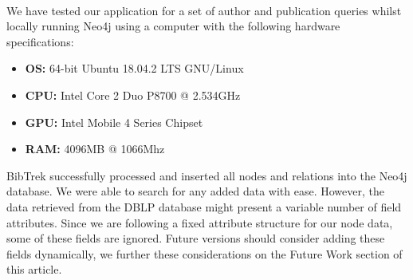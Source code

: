 \documentclass[twocolumn]{article}
\begin{document}
\\[1\baselineskip]
We have tested our application for a set of author and publication queries whilst locally running Neo4j using a computer with the following hardware specifications:
\begin{itemize}
\item \textbf{OS:} 64-bit Ubuntu 18.04.2 LTS GNU/Linux 
\item \textbf{CPU:} Intel Core 2 Duo P8700 @ 2.534GHz 
\item \textbf{GPU:} Intel Mobile 4 Series Chipset
\item \textbf{RAM:} 4096MB @ 1066Mhz 
\end{itemize}
BibTrek successfully processed and inserted all nodes and relations into the Neo4j database. We were able to search for any added data with ease. However, the data retrieved from the DBLP database might present a variable number of field attributes. Since we are following a fixed attribute structure for our node data, some of these fields are ignored. Future versions should consider adding these fields dynamically, we further these considerations on the Future Work section of this article.
\end{document}
